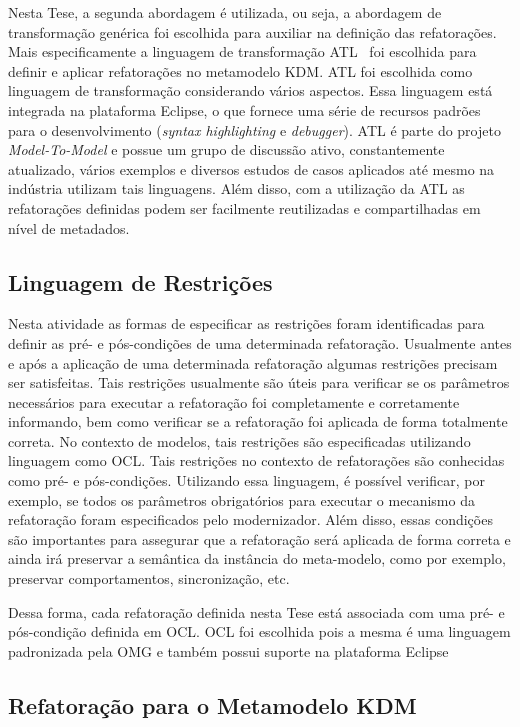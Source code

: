 Nesta Tese, a segunda abordagem é utilizada, ou seja, a abordagem de transformação genérica foi escolhida para auxiliar na definição das refatorações. Mais especificamente a linguagem de transformação ATL~\cite{ATL_eclipse,Jouault_2008} foi escolhida para definir e aplicar refatorações no metamodelo KDM. ATL foi escolhida como linguagem de transformação considerando vários aspectos. Essa linguagem está integrada na plataforma Eclipse, o que fornece uma série de recursos padrões para o desenvolvimento (\textit{syntax highlighting} e \textit{debugger}). ATL é parte do projeto \textit{Model-To-Model} e possue um grupo de discussão ativo, constantemente atualizado, vários exemplos e diversos estudos de casos aplicados até mesmo na indústria utilizam tais linguagens. Além disso, com a utilização da ATL as refatorações definidas podem ser facilmente reutilizadas e compartilhadas em nível de metadados.

\subsection{Linguagem de Restrições}

Nesta atividade as formas de especificar as restrições foram identificadas para definir as pré- e pós-condições de uma determinada refatoração. Usualmente antes e após a aplicação de uma determinada refatoração algumas restrições precisam ser satisfeitas. Tais restrições usualmente são úteis para verificar se os parâmetros necessários para executar a refatoração foi completamente e corretamente informando, bem como verificar se a refatoração foi aplicada de forma totalmente correta. No contexto de modelos, tais restrições são especificadas utilizando linguagem como OCL. Tais restrições no contexto de refatorações são conhecidas como pré- e pós-condições. Utilizando essa linguagem, é possível verificar, por exemplo, se todos os parâmetros obrigatórios para executar o mecanismo da refatoração foram especificados pelo modernizador. Além disso, essas condições são importantes para assegurar que a refatoração será aplicada de forma correta e ainda irá preservar a semântica da instância do meta-modelo, como por exemplo, preservar comportamentos, sincronização, etc. 

Dessa forma, cada refatoração definida nesta Tese está associada com uma pré- e pós-condição definida em OCL. OCL foi escolhida pois a mesma é uma linguagem padronizada pela OMG e também possui suporte na plataforma Eclipse


\subsection{Refatoração para o Metamodelo KDM}

